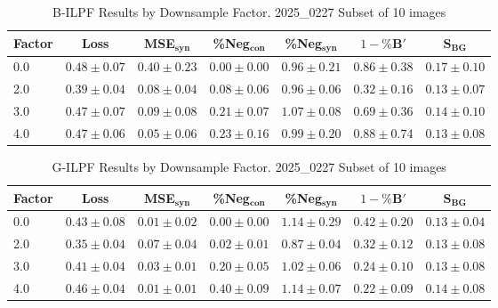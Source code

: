 \begin{table}[h]
\centering
\small
\begin{tabular}{lcccccc}
\hline
Factor & Loss & MSE$_{\mathbf{syn}}$ & \%Neg$_{\mathbf{con}}$ & \%Neg$_{\mathbf{syn}}$ & $1-\%\mathbf{B}'$ & $\mathbf{S}_{\mathbf{BG}}$ \\
\hline
0.0 & $0.48 \pm 0.07$ & $0.40 \pm 0.23$ & $0.00 \pm 0.00$ & $0.96 \pm 0.21$ & $0.86 \pm 0.38$ & $0.17 \pm 0.10$ \\
2.0 & $0.39 \pm 0.04$ & $0.08 \pm 0.04$ & $0.08 \pm 0.06$ & $0.96 \pm 0.06$ & $0.32 \pm 0.16$ & $0.13 \pm 0.07$ \\
3.0 & $0.47 \pm 0.07$ & $0.09 \pm 0.08$ & $0.21 \pm 0.07$ & $1.07 \pm 0.08$ & $0.69 \pm 0.36$ & $0.14 \pm 0.10$ \\
4.0 & $0.47 \pm 0.06$ & $0.05 \pm 0.06$ & $0.23 \pm 0.16$ & $0.99 \pm 0.20$ & $0.88 \pm 0.74$ & $0.13 \pm 0.08$ \\
\hline
\end{tabular}
\caption{B-ILPF Results by Downsample Factor. 2025\_0227 Subset of 10 images}
\label{tab:downsample_sb}
\end{table}

\begin{table}[h]
\centering
\small
\begin{tabular}{lcccccc}
\hline
Factor & Loss & MSE$_{\mathbf{syn}}$ & \%Neg$_{\mathbf{con}}$ & \%Neg$_{\mathbf{syn}}$ & $1-\%\mathbf{B}'$ & $\mathbf{S}_{\mathbf{BG}}$ \\
\hline
0.0 & $0.43 \pm 0.08$ & $0.01 \pm 0.02$ & $0.00 \pm 0.00$ & $1.14 \pm 0.29$ & $0.42 \pm 0.20$ & $0.13 \pm 0.04$ \\
2.0 & $0.35 \pm 0.04$ & $0.07 \pm 0.04$ & $0.02 \pm 0.01$ & $0.87 \pm 0.04$ & $0.32 \pm 0.12$ & $0.13 \pm 0.08$ \\
3.0 & $0.41 \pm 0.04$ & $0.03 \pm 0.01$ & $0.20 \pm 0.05$ & $1.02 \pm 0.06$ & $0.24 \pm 0.10$ & $0.13 \pm 0.08$ \\
4.0 & $0.46 \pm 0.04$ & $0.01 \pm 0.01$ & $0.40 \pm 0.09$ & $1.14 \pm 0.07$ & $0.22 \pm 0.09$ & $0.14 \pm 0.08$ \\
\hline
\end{tabular}
\caption{G-ILPF Results by Downsample Factor. 2025\_0227 Subset of 10 images}
\label{tab:downsample_sg}
\end{table}

